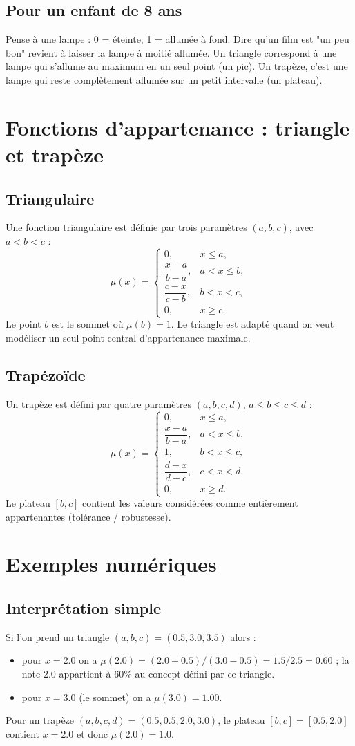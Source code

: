 \documentclass[a4paper,11pt]{article}
\begin{document}
\subsection*{Pour un enfant de 8 ans}
Pense à une lampe : 0 = éteinte, 1 = allumée à fond. Dire qu'un film est "un peu bon" revient à laisser la lampe à moitié allumée. Un triangle correspond à une lampe qui s'allume au maximum en un seul point (un pic). Un trapèze, c'est une lampe qui reste complètement allumée sur un petit intervalle (un plateau).

\section{Fonctions d'appartenance : triangle et trapèze}
\subsection*{Triangulaire}
Une fonction triangulaire est définie par trois paramètres $(a,b,c)$, avec $a<b<c$ :
$$
\mu(x)=\begin{cases}
0, & x\le a,\\
\dfrac{x-a}{b-a}, & a<x\le b,\\
\dfrac{c-x}{c-b}, & b<x<c,\\
0, & x\ge c.
\end{cases}
$$
Le point $b$ est le sommet où $\mu(b)=1$. Le triangle est adapté quand on veut modéliser un seul point central d'appartenance maximale.

\subsection*{Trapézoïde}
Un trapèze est défini par quatre paramètres $(a,b,c,d)$, $a\le b\le c\le d$ :
$$
\mu(x)=\begin{cases}
0, & x\le a,\\
\dfrac{x-a}{b-a}, & a<x\le b,\\
1, & b<x\le c,\\
\dfrac{d-x}{d-c}, & c<x<d,\\
0, & x\ge d.
\end{cases}
$$
Le plateau $[b,c]$ contient les valeurs considérées comme entièrement appartenantes (tolérance / robustesse).

\section{Exemples numériques}
\subsection*{Interprétation simple}
Si l'on prend un triangle $(a,b,c)=(0.5,3.0,3.5)$ alors :
\begin{itemize}
    \item pour $x=2.0$ on a $\mu(2.0)=(2.0-0.5)/(3.0-0.5)=1.5/2.5=0.60$ ; la note 2.0 appartient à 60\% au concept défini par ce triangle.
    \item pour $x=3.0$ (le sommet) on a $\mu(3.0)=1.00$.
\end{itemize}
Pour un trapèze $(a,b,c,d)=(0.5,0.5,2.0,3.0)$, le plateau $[b,c]=[0.5,2.0]$ contient $x=2.0$ et donc $\mu(2.0)=1.0$.
\end{document}
